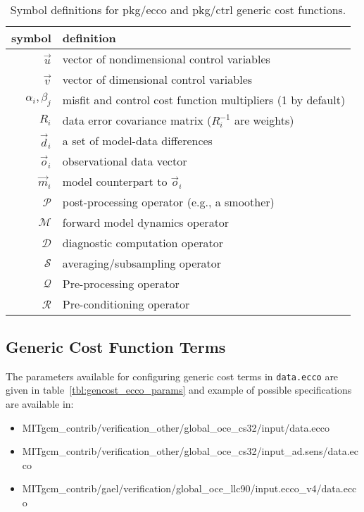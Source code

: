 \begin{table}[!ht]
\centering
\begin{tabular}{rl}
symbol			&	definition	\\ \hline
$\vec{u}$			&	vector of nondimensional control variables \\
$\vec{v}$			&	vector of dimensional control variables \\
$\alpha_i, \beta_j$	&	misfit and control cost function multipliers (1 by default) \\
$R_i$ 			&	data error covariance matrix ($R_i^{-1}$ are weights) \\
$\vec{d}_i$		&	a set of model-data differences \\
$\vec{o}_i$		&	observational data vector \\
$\vec{m}_i$		&	model counterpart to $\vec{o}_i$ \\
$\mathcal{P}$		&	post-processing operator (e.g., a smoother) \\
$\mathcal{M}$		&	forward model dynamics operator \\
$\mathcal{D}$		&	diagnostic computation operator \\
$\mathcal{S}$		&	averaging/subsampling operator \\
$\mathcal{Q}$		&	Pre-processing operator \\
$\mathcal{R}$		&	Pre-conditioning operator
\end{tabular}
\caption{Symbol definitions for pkg/ecco and pkg/ctrl generic cost functions.}
\label{tbl:gencost_symbols}
\end{table}

\subsection{Generic Cost Function Terms} \label{costgen}

The parameters available for configuring generic cost terms in \texttt{data.ecco} are given in table~\ref{tbl:gencost_ecco_params} and example of possible specifications are available in:
\begin{itemize}
\itemsep0em
\item MITgcm\_contrib/verification\_other/global\_oce\_cs32/input/data.ecco
\item MITgcm\_contrib/verification\_other/global\_oce\_cs32/input\_ad.sens/data.ecco
\item MITgcm\_contrib/gael/verification/global\_oce\_llc90/input.ecco\_v4/data.ecco
\end{itemize}
 
